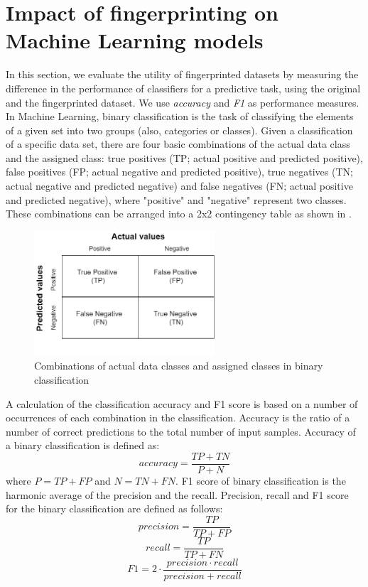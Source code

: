 \section{Impact of fingerprinting on Machine Learning models}\label{sec:Learning}
In this section, we evaluate the utility of fingerprinted datasets by measuring the difference in the performance of classifiers for a predictive task, using the original and the fingerprinted dataset. 
We use \textit{accuracy} and \textit{F1} as performance measures. 
In Machine Learning, binary classification is the task of classifying the elements of a given set into two groups (also, categories or classes). 
Given a classification of a specific data set, there are four basic combinations of the actual data class and the assigned class: true positives (TP; actual positive and predicted positive), false positives (FP; actual negative and predicted positive), true negatives (TN; actual negative and predicted negative) and false negatives (FN; actual positive and predicted negative), where "positive" and "negative" represent two classes. 
These combinations can be arranged into a 2x2 contingency table as shown in .

\begin{figure}
    \centering
    \includegraphics[width=0.6\textwidth]{Figures/confusion.png}
    \caption{Combinations of actual data classes and assigned classes in binary classification}
    \label{fig:confusion-matrix-binary}
\end{figure}

A calculation of the classification accuracy and F1 score is based on a number of occurrences of each combination in the classification. 
Accuracy is the ratio of a number of correct predictions to the total number of input samples.
Accuracy of a binary classification is defined as:
\begin{equation}\label{eq:accuracy-binary}
    accuracy = \frac{TP+TN}{P+N}
\end{equation}
where $P = TP+FP$ and $N = TN+FN$.
F1 score of binary classification is the harmonic average of the precision and the recall.
Precision, recall and F1 score for the binary classification are defined as follows:
\begin{equation}
    precision = \frac{TP}{TP+FP}
\end{equation}
\begin{equation}
    recall = \frac{TP}{TP+FN}
\end{equation}
\begin{equation}\label{eq:f1-binary}
    F1 = 2 \cdot \frac{precision \cdot recall}{precision + recall}
\end{equation}

